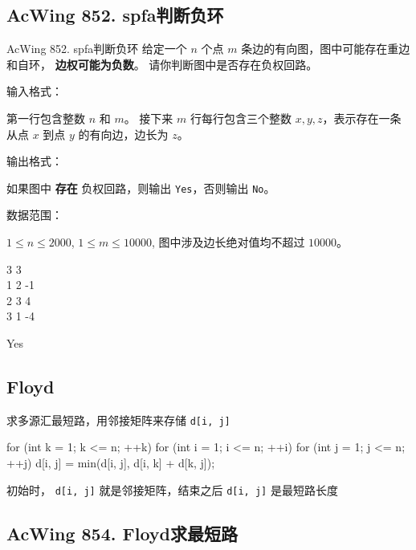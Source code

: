 \subsection{AcWing 852. spfa判断负环}

\begin{titledbox}{AcWing 852. spfa判断负环}
    给定一个 $n$ 个点 $m$ 条边的有向图，图中可能存在重边和自环， \textbf{边权可能为负数}。 请你判断图中是否存在负权回路。

    输入格式：

    第一行包含整数 $n$ 和 $m$。 接下来 $m$ 行每行包含三个整数 $x,y,z$，表示存在一条从点 $x$ 到点 $y$ 的有向边，边长为 $z$。

    输出格式：

    如果图中 \textbf{存在} 负权回路，则输出 \lstinline{Yes}，否则输出 \lstinline{No}。

    数据范围：

    $1 \le n \le 2000$, $1 \le m \le 10000$, 图中涉及边长绝对值均不超过 $10000$。

    \begin{inputblock}
        3 3 \\
        1 2 -1 \\
        2 3 4 \\
        3 1 -4
    \end{inputblock}
    \begin{outputblock}
        Yes
    \end{outputblock}
\end{titledbox}

\subsection{Floyd}
求多源汇最短路，用邻接矩阵来存储 \lstinline{d[i, j]}

\begin{mycpponecol}[Floyd算法]
    for (int k = 1; k <= n; ++k) {
        for (int i = 1; i <= n; ++i) {
            for (int j = 1; j <= n; ++j) {
                d[i, j] = min(d[i, j], d[i, k] + d[k, j]);
            }
        }
    }
\end{mycpponecol}

初始时， \lstinline{d[i, j]} 就是邻接矩阵，结束之后 \lstinline{d[i, j]} 是最短路长度

\subsection{AcWing 854. Floyd求最短路}

